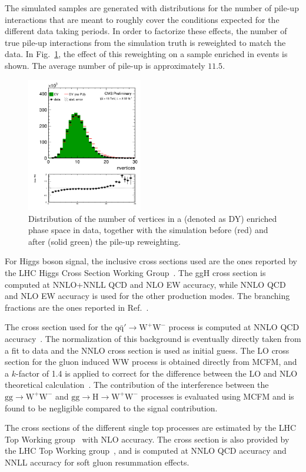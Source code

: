 The simulated samples are generated with distributions for the number of pile-up interactions that are meant to roughly cover the conditions expected for the different data taking periods. In order to factorize these effects, the number of true pile-up interactions from the simulation truth is reweighted to match the data.
In Fig.~\ref{Fig:pu}, the effect of this reweighting on a sample enriched in \dyll events is shown. The average number of pile-up is approximately $11.5$.

\begin{figure}[htbp]
\centering
\includegraphics[width=0.45\textwidth]{images/13TeV/nvertices.png}
\caption{
    Distribution of the number of vertices in a \dyll (denoted as DY) enriched phase space in data,
    together with the simulation before (red) and after (solid green) the pile-up reweighting.}
    \label{Fig:pu}
\end{figure}

For Higgs boson signal, the inclusive cross sections used are the ones reported by the LHC Higgs Cross Section Working Group~\cite{temphiggsxsecs}. The ggH cross section is computed at NNLO+NNLL QCD and NLO EW accuracy, while NNLO QCD and NLO EW accuracy is used for the other production modes. The branching fractions are the ones reported in Ref.~\cite{Heinemeyer:2013tqa}.

The cross section used for the $\mathrm{q\bar{q}' \to W^+W^-}$ process is computed at NNLO QCD accuracy~\cite{Gehrmann:2014fva}. The normalization of this background is eventually directly taken from a fit to data and the NNLO cross section is used as initial guess. The LO cross section for the gluon induced WW process is obtained directly from \textsc{MCFM}, and a $k$-factor of 1.4 is applied to correct for the difference between the LO and NLO theoretical calculation~\cite{Caola:2015rqy}.
The contribution of the interference between the $\mathrm{gg \to W^+W^-}$ and $\mathrm{gg\to H\to W^+W^-}$ processes is evaluated using \textsc{MCFM} and is found to be negligible compared to the signal contribution.

The cross sections of the different single top processes are estimated by the LHC Top Working group~\cite{singletop} with NLO accuracy.
The \ttbar cross section is also provided by the LHC Top Working group~\cite{topxsec}, and is computed at NNLO QCD accuracy and NNLL accuracy for soft gluon resummation effects.

